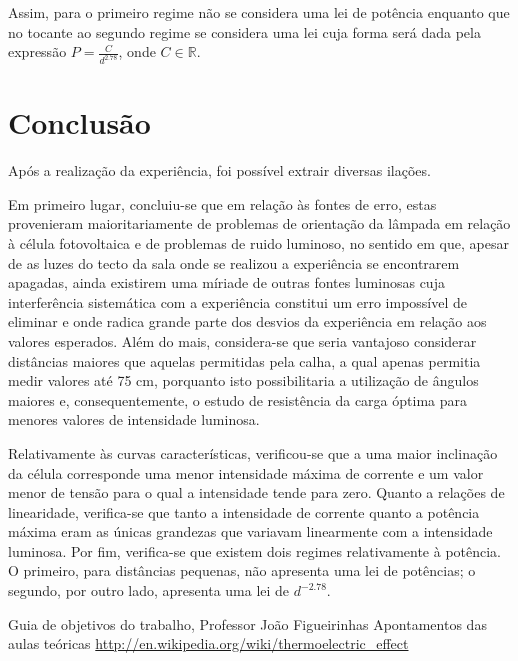 \documentclass[10pt]{extarticle}
\begin{document}
\begin{multicols}{2}
\par Assim, para o primeiro regime não se considera uma lei de potência enquanto que no tocante ao segundo regime se considera uma lei cuja forma será dada pela expressão $P=\frac{C}{d^{2.78}}$, onde $C\in\mathbb{R}$.

\section{Conclusão}

\par Após a realização da experiência, foi possível extrair diversas ilações. 

\par Em primeiro lugar, concluiu-se que em relação às fontes de erro, estas provenieram maioritariamente de problemas de orientação da lâmpada em relação à célula fotovoltaica e de problemas de ruido luminoso, no sentido em que, apesar de as luzes do tecto da sala onde se realizou a experiência se encontrarem apagadas, ainda existirem uma míriade de outras fontes luminosas cuja interferência sistemática com a experiência constitui um erro impossível de eliminar e onde radica grande parte dos desvios da experiência em relação aos valores esperados. Além do mais, considera-se que seria vantajoso considerar distâncias maiores que aquelas permitidas pela calha, a qual apenas permitia medir valores até 75 cm, porquanto isto possibilitaria a utilização de ângulos maiores e, consequentemente, o estudo de resistência da carga óptima para menores valores de intensidade luminosa.

\par Relativamente às curvas características, verificou-se que a uma maior inclinação da célula corresponde uma menor intensidade máxima de corrente e um valor menor de tensão para o qual a intensidade tende para zero. Quanto a relações de linearidade, verifica-se que tanto a intensidade de corrente quanto a potência máxima eram as únicas grandezas que variavam linearmente com a intensidade luminosa. Por fim, verifica-se que existem dois regimes relativamente à potência. O primeiro, para distâncias pequenas, não apresenta uma lei de potências; o segundo, por outro lado, apresenta uma lei de $d^{-2.78}$.


\end{multicols}

\begin{thebibliography}{9}

 Guia de objetivos do trabalho, Professor João Figueirinhas
 Apontamentos das aulas teóricas
  \url{http://en.wikipedia.org/wiki/thermoelectric\_effect}
\end{thebibliography}
\end{document}
